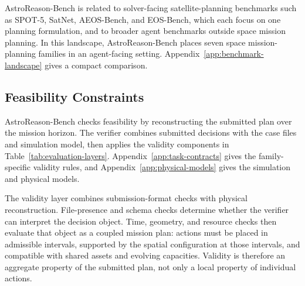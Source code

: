 \documentclass[11pt]{article}
\begin{document}
AstroReason-Bench is related to solver-facing satellite-planning benchmarks such as SPOT-5, SatNet, AEOS-Bench, and EOS-Bench, which each focus on one planning formulation, and to broader agent benchmarks outside space mission planning. In this landscape, AstroReason-Bench places seven space mission-planning families in an agent-facing setting. Appendix~\ref{app:benchmark-landscape} gives a compact comparison.

\subsection{Feasibility Constraints}
\label{sec:feasibility-constraints}

AstroReason-Bench checks feasibility by reconstructing the submitted plan over the mission horizon. The verifier combines submitted decisions with the case files and simulation model, then applies the validity components in Table~\ref{tab:evaluation-layers}. Appendix~\ref{app:task-contracts} gives the family-specific validity rules, and Appendix~\ref{app:physical-models} gives the simulation and physical models.

The validity layer combines submission-format checks with physical reconstruction. File-presence and schema checks determine whether the verifier can interpret the decision object. Time, geometry, and resource checks then evaluate that object as a coupled mission plan: actions must be placed in admissible intervals, supported by the spatial configuration at those intervals, and compatible with shared assets and evolving capacities. Validity is therefore an aggregate property of the submitted plan, not only a local property of individual actions.
\end{document}
